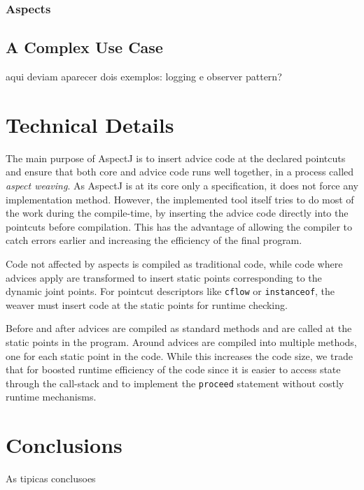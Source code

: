\documentclass{template}
\begin{document}
\subsubsection{Aspects}

\subsection{A Complex Use Case}

aqui deviam aparecer dois exemplos: logging e observer pattern?

\section{Technical Details}

The main purpose of AspectJ is to insert advice code at the declared pointcuts and ensure that
both core and advice code runs well together, in a process called \emph{aspect weaving}.
As AspectJ is at its core only a specification, it does not force any implementation method.
However, the implemented tool itself tries to do most of the work during the compile-time, by
inserting the advice code directly into the pointcuts before compilation. This has the advantage of
allowing the compiler to catch errors earlier and increasing the efficiency of the final program.

Code not affected by aspects is compiled as traditional code, while code where advices apply are
transformed to insert static points corresponding to the dynamic joint points.
For pointcut descriptors like \texttt{cflow} or \texttt{instanceof}, the weaver must insert
code at the static points for runtime checking.

Before and after advices are compiled as standard methods and are called at the static points in
the program. Around advices are compiled into multiple methods, one for each static point in the code.
While this increases the code size, we trade that for boosted runtime efficiency of the code since
it is easier to access state through the call-stack and to implement the \texttt{proceed} statement
without costly runtime mechanisms.

\section{Conclusions}

As tipicas conclusoes \cite{Kiczales97aspect-orientedprogramming}




\balancecolumns
\end{document}
